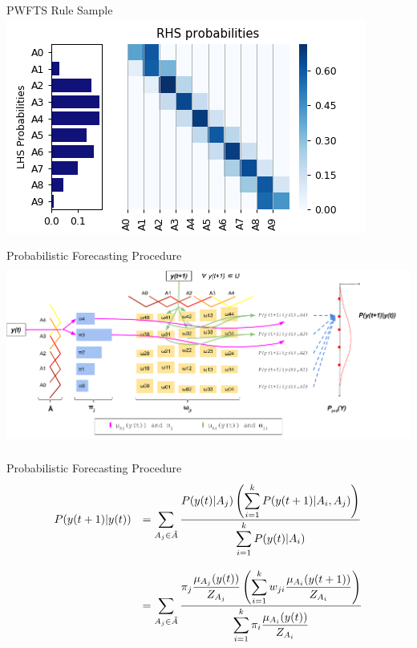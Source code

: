 \documentclass{beamer}
\begin{document}

\begin{frame}{PWFTS Rule Sample}
\includegraphics[width=\textwidth]{figures/pwfts_rules_firstorder.png}
\end{frame}


\begin{frame}{Probabilistic Forecasting Procedure}
\includegraphics[width=1.1\textwidth,height=6cm]{figures/pwfts_probabilistic_forecasting.pdf}
\end{frame}



\begin{frame}{Probabilistic Forecasting Procedure}
\begin{equation}
\begin{array}{cl}
P(y(t+1) | y(t)) &=  \displaystyle \sum_{A_j \in  \tilde{A}}\frac{\displaystyle P(y(t)| A_j) \left( \sum_{i = 1}^k  P(y(t+1) | A_i,A_j) \right)}{\displaystyle \sum_{i = 1}^k P(y(t)| A_i)}  \\
& \\
 &= \displaystyle \sum_{A_j \in  \tilde{A}} \frac{ \displaystyle  \pi_j\frac{\mu_{A_j}(y(t))}{Z_{A_j}} \left( \sum_{i = 1}^k  w_{ji}\frac{\mu_{A_i}(y(t+1))}{Z_{A_i}} \right)}{\displaystyle \sum_{i = 1}^k \pi_i\frac{\mu_{A_i}(y(t))}{Z_{A_i}}}
\end{array}
\label{eqn:pwfts_probabilistic}
\end{equation}
\end{frame}
\end{document}
